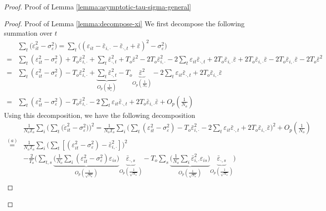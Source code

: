 \begin{proof}{Proof of Lemma \ref{lemma:asymptotic-tau-sigma-general}}
\begin{proof}{Proof of Lemma \ref{lemma:decompose-xi}}
We first decompose the following summation over $t$
    \begin{align*}
& \sum_t \big( \dot{\varepsilon}^2_{it} - \sigma_\varepsilon^2 \big) = \sum_t \big( (\varepsilon_{it} - \bar{\varepsilon}_{i,\cdot} - \bar{\varepsilon}_{\cdot,t} + \bar{\varepsilon})^2 - \sigma_\varepsilon^2 \big)\\ =& \sum_t (\varepsilon_{it}^2 - \sigma_\varepsilon^2) + T_o \bar{\varepsilon}_{i,\cdot}^2 + \sum_t \bar{\varepsilon}_{\cdot,t}^2 + T_o \bar{\varepsilon}^2  - 2 T_o \bar{\varepsilon}_{i,\cdot}^2 - 2 \sum_t \varepsilon_{it} \bar{\varepsilon}_{\cdot,t} + 2T_o \bar{\varepsilon}_{i,\cdot}\bar{\varepsilon} + 2T_o \bar{\varepsilon}_{i,\cdot}\bar{\varepsilon} -2 T_o \bar{\varepsilon}_{i,\cdot} \bar{\varepsilon} - 2T_o \bar{\varepsilon}^2 \\
=& \sum_t (\varepsilon_{it}^2 - \sigma_\varepsilon^2) - T_o \bar{\varepsilon}_{i,\cdot}^2 + \underbrace{\sum_t \bar{\varepsilon}_{\cdot,t}^2}_{O_p\left(\frac{1}{N_o} \right)} - T_o \underbrace{\bar{\varepsilon}^2}_{O_p\left(\frac{1}{N_o} \right)} - 2 \sum_t \varepsilon_{it} \bar{\varepsilon}_{\cdot,t}+ 2T_o \bar{\varepsilon}_{i,\cdot}\bar{\varepsilon}  \\
=& \sum_t (\varepsilon_{it}^2 - \sigma_\varepsilon^2) - T_o \bar{\varepsilon}_{i,\cdot}^2 - 2 \sum_t \varepsilon_{it} \bar{\varepsilon}_{\cdot,t}+ 2T_o \bar{\varepsilon}_{i,\cdot}\bar{\varepsilon} + O_p\left(\frac{1}{N_o} \right)
\end{align*}
Using this decomposition, we have the following decomposition
\begin{align*}
    &\frac{1}{N_o T_o} \sum_i \Big(\sum_{t} \big( \dot{\varepsilon}^2_{it} - \sigma_\varepsilon^2 \big) \Big)^2 =\frac{1}{N_o T_o} \sum_i \Big(  \sum_t (\varepsilon_{it}^2 - \sigma_\varepsilon^2) - T_o \bar{\varepsilon}_{i,\cdot}^2 - 2 \sum_t \varepsilon_{it} \bar{\varepsilon}_{\cdot,t}+ 2T_o \bar{\varepsilon}_{i,\cdot}\bar{\varepsilon}\Big)^2 + O_p\left(\frac{1}{N_o} \right) \\
    \stackrel{(a)}{=}&  \frac{1}{N_o T_o} \sum_i \Big( \sum_{t} [ ( \varepsilon_{it}^2 - \sigma^2_\varepsilon) -  \bar{\varepsilon}_{i,\cdot}^2] \Big)^2 \\
    & -\frac{2}{T_o}  \Big(  \sum_{t,s} \underbrace{\Big(\frac{1}{N_o} \sum_{i} (\varepsilon_{it}^2 - \sigma_\varepsilon^2)\varepsilon_{is} \Big) }_{O_p\left(\frac{1}{\sqrt{N_o}}\right)}\underbrace{\bar{\varepsilon}_{\cdot,s} }_{O_p\left(\frac{1}{\sqrt{N_o}} \right)}- T_o \sum_s \underbrace{\Big( \frac{1}{N_o}\sum_{i} \bar{\varepsilon}_{i,\cdot}^2 \varepsilon_{is}  \Big)}_{O_p\left(\frac{1}{\sqrt{N_o}}\right)} \underbrace{\bar{\varepsilon}_{\cdot,s}}_{O_p\left(\frac{1}{\sqrt{N_o}}\right)}\Big)  \\

\end{align*}
\end{proof}
\end{proof}
